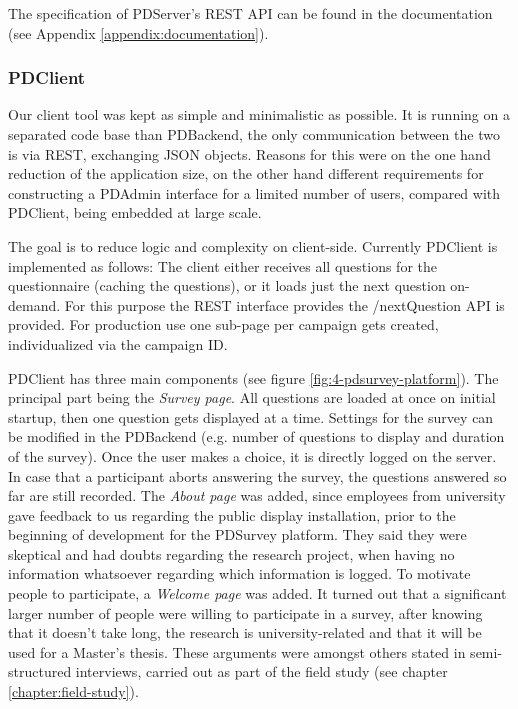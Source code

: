 		The specification of PDServer's REST API can be found in the documentation (see Appendix \ref{appendix:documentation}).



	\subsubsection{PDClient}

		Our client tool was kept as simple and minimalistic as possible. It is running on a separated code base than PDBackend, the only communication between the two is via REST, exchanging JSON objects. Reasons for this were on the one hand reduction of the application size, on the other hand different requirements for constructing a PDAdmin interface for a limited number of users, compared with PDClient, being embedded at large scale.

		The goal is to reduce logic and complexity on client-side. Currently PDClient is implemented as follows: The client either receives all questions for the questionnaire (caching the questions), or it loads just the next question on-demand. For this purpose the REST interface provides the /nextQuestion API is provided. For production use one sub-page per campaign gets created, individualized via the campaign ID.
		

		PDClient has three main components (see figure \ref{fig:4-pdsurvey-platform}). The principal part being the \textit{Survey page}. All questions are loaded at once on initial startup, then one question gets displayed at a time. Settings for the survey can be modified in the PDBackend (e.g. number of questions to display and duration of the survey). Once the user makes a choice, it is directly logged on the server. In case that a participant aborts answering the survey, the questions answered so far are still recorded. The \textit{About page} was added, since employees from university gave feedback to us regarding the public display installation, prior to the beginning of development for the PDSurvey platform. They said they were skeptical and had doubts regarding the research project, when having no information whatsoever regarding which information is logged. To motivate people to participate, a \textit{Welcome page} was added. It turned out that a significant larger number of people were willing to participate in a survey, after knowing that it doesn't take long, the research is university-related and that it will be used for a Master's thesis. These arguments were amongst others stated in semi-structured interviews, carried out as part of the field study (see chapter \ref{chapter:field-study}).


